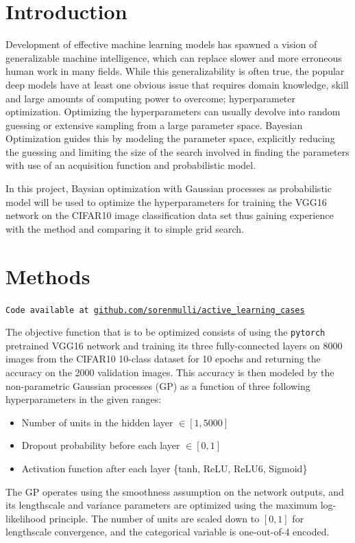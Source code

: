 \documentclass[12pt,fleqn]{article}
\begin{document}
\begin{multicols}{2}


\section{Introduction} 
Development of effective machine learning models has spawned a vision of generalizable machine intelligence, which can replace slower and more erroneous human work in many fields. While this generalizability is often true, the popular deep models have at least one obvious issue that requires domain knowledge, skill and large amounts of computing power to overcome; hyperparameter optimization. Optimizing the hyperparameters can usually devolve into random guessing or extensive sampling from a large parameter space. Bayesian Optimization guides this by modeling the parameter space, explicitly reducing the guessing and limiting the size of the search involved in finding the parameters with use of an acquisition function and probabilistic model.

In this project, Baysian optimization with Gaussian processes as probabilistic model will be used to optimize the hyperparameters for training the VGG16 network on the CIFAR10 image classification data set thus gaining experience with the method and comparing it to simple grid search.
\vspace*{-0.3cm}
\section{Methods}
\vspace*{-0.2cm}
\texttt{Code available at \url{github.com/sorenmulli/active_learning_cases}}

The objective function that is to be optimized consists of using the \texttt{pytorch} pretrained VGG16 network \cite{vgg} and training its three fully-connected layers on 8000 images from the CIFAR10 10-class dataset \cite{cifar10} for 10 epochs and returning the accuracy on the 2000 validation images. 
This accuracy is then modeled by the non-parametric Gaussian processes (GP) as a function of three following hyperparameters in the given ranges:
\vspace*{-0.05cm}
\begin{itemize}
	\item Number of units in the hidden layer \(\in [1, 5000]\) 
	\item Dropout probability before each layer \(\in [0,1]\)
	\item Activation function after each layer \{tanh, ReLU, ReLU6, Sigmoid\}
\end{itemize}
The GP operates using the smoothness assumption on the network outputs, and its lengthscale and variance parameters are optimized using the maximum log-likelihood principle. The number of units are scaled down to \([0,1]\) for lengthscale convergence, and the categorical variable is one-out-of-4 encoded. 


\end{multicols}
\end{document}
